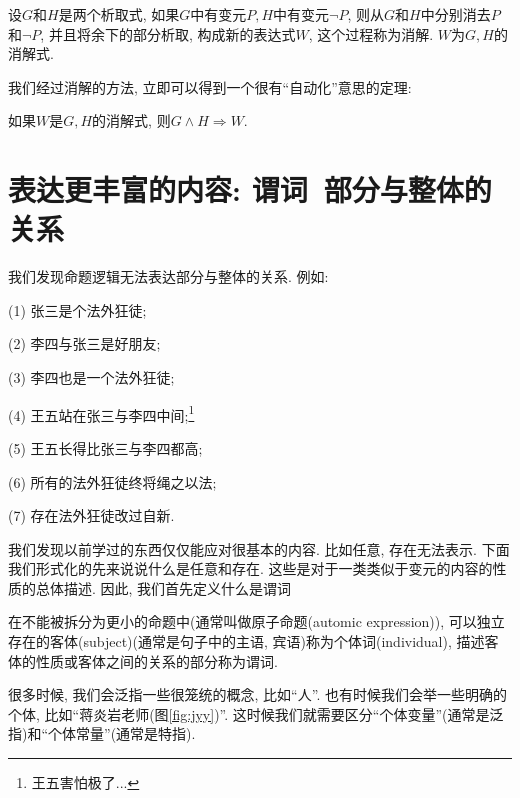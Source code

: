 \begin{definition}[消解与消解式]
	设$G$和$H$是两个析取式, 如果$G$中有变元$P,H$中有变元$\lnot P$, 则从$G$和$H$中分别消去$P$和$\lnot P$, 并且将余下的部分析取, 构成新的表达式$W$, 这个过程称为消解. $W$为$G,H$的消解式. 
\end{definition}

我们经过消解的方法, 立即可以得到一个很有``自动化''意思的定理: 

\begin{theorem}
	如果$W$是$G,H$的消解式, 则$G\land H\Rightarrow W$. 
\end{theorem}

\section{表达更丰富的内容: 谓词~部分与整体的关系}

我们发现命题逻辑无法表达部分与整体的关系. 例如: 

\begin{example}
	(1) 张三是个法外狂徒; 
	
	(2) 李四与张三是好朋友;
	
	(3) 李四也是一个法外狂徒;
	
	(4) 王五站在张三与李四中间;\footnote{王五害怕极了...} 
	
	(5) 王五长得比张三与李四都高;
	
	(6) 所有的法外狂徒终将绳之以法;
	
	(7) 存在法外狂徒改过自新. 
\end{example}


我们发现以前学过的东西仅仅能应对很基本的内容. 比如任意, 存在无法表示. 下面我们形式化的先来说说什么是任意和存在. 这些是对于一类类似于变元的内容的性质的总体描述. 因此,  我们首先定义什么是谓词

\begin{definition}[谓词(predicate)]
	在不能被拆分为更小的命题中(通常叫做原子命题(automic expression)), 可以独立存在的客体(subject)(通常是句子中的主语, 宾语)称为个体词(individual), 描述客体的性质或客体之间的关系的部分称为谓词. 
\end{definition}

很多时候, 我们会泛指一些很笼统的概念, 比如``人''. 也有时候我们会举一些明确的个体, 比如``蒋炎岩老师(图\ref{fig:jyy})''. 这时候我们就需要区分``个体变量''(通常是泛指)和``个体常量''(通常是特指).

